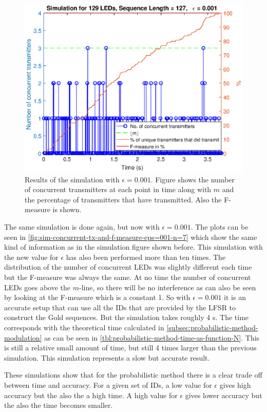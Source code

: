 \begin{figure}[h]
	\centering
	\includegraphics[width=\textwidth]{chapters/evaluation-chapters/simulation/sim-concurrent-tx-and-f-measure-eps=001-n=7.eps}
	\caption{Results of the simulation with $\epsilon = 0.001$. Figure shows the number of concurrent transmitters at each point in time along with $m$ and the percentage of transmitters that have transmitted. Also the F-measure is shown.}
	\label{fig:sim-concurrent-tx-and-f-measure-eps=001-n=7}
\end{figure}






The same simulation is done again, but now with $\epsilon = 0.001$.
The plots can be seen in \autoref{fig:sim-concurrent-tx-and-f-measure-eps=001-n=7} which show the same kind of information as in the simulation figure shown before.
This simulation with the new value for $\epsilon$ has also been performed more than ten times.
The distribution of the number of concurrent LEDs was slightly different each time but the F-measure was always the same.
At no time the number of concurrent LEDs goes above the $m$-line, so there will be no interference as can also be seen by looking at the F-measure which is a constant 1.
So with $\epsilon = 0.001$ it is an accurate setup that can use all the IDs that are provided by the LFSR to construct the Gold sequences.
But the simulation takes roughly 4 s.
The time corresponds with the theoretical time calculated in \autoref{subsec:probabilistic-method-modulation} as can be seen in \autoref{tbl:probabilistic-method-time-as-function-N}.
This is still a relative small amount of time, but still 4 times larger than the previous simulation.
This simulation represents a slow but accurate result.



 

These simulations show that for the probabilistic method there is a clear trade off between time and accuracy.
For a given set of IDs, a low value for $\epsilon$ gives high accuracy but the also the a high time.
A high value for $\epsilon$ gives lower accuracy but the also the time becomes smaller.